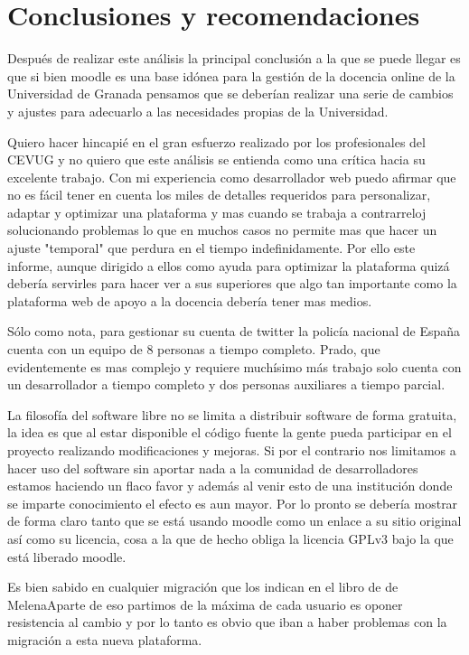 \chapter{Conclusiones y recomendaciones}

Después de realizar este análisis la principal conclusión a la que se puede llegar es que si bien moodle es una base idónea para la gestión de la docencia online de la Universidad de Granada pensamos que se deberían realizar una serie de cambios y ajustes para adecuarlo a las necesidades propias de la Universidad.

\bigskip
Quiero hacer hincapié en el gran esfuerzo realizado por los profesionales del CEVUG y no quiero que este análisis se entienda como una crítica hacia su excelente trabajo. Con mi experiencia como desarrollador web puedo afirmar que no es fácil tener en cuenta los miles de detalles requeridos para personalizar, adaptar y optimizar una plataforma y mas cuando se trabaja a contrarreloj solucionando problemas lo que en muchos casos no permite mas que hacer un ajuste "temporal" que perdura en el tiempo indefinidamente. Por ello este informe, aunque dirigido a ellos como ayuda para optimizar la plataforma quizá debería servirles para hacer ver a sus superiores que algo tan importante como la plataforma web de apoyo a la docencia debería tener mas medios.

\bigskip
Sólo como nota, para gestionar su cuenta de twitter la policía nacional de España cuenta con un equipo de 8 personas a tiempo completo. Prado, que evidentemente es mas complejo y requiere muchísimo más trabajo solo cuenta con un desarrollador a tiempo completo y dos personas auxiliares a tiempo parcial.

\bigskip

La filosofía del software libre no se limita a distribuir software de forma gratuita, la idea es que al estar disponible el código fuente la gente pueda participar en el proyecto realizando modificaciones y mejoras. Si por el contrario nos limitamos a hacer uso del software sin aportar nada a la comunidad de desarrolladores estamos haciendo un flaco favor y además al venir esto de una institución donde se imparte conocimiento el efecto es aun mayor. Por lo pronto se debería mostrar de forma claro tanto que se está usando moodle como un enlace a su sitio original así como su licencia, cosa a la que de hecho obliga la licencia GPLv3 bajo la que está liberado moodle.

\bigskip

Es bien sabido en cualquier migración que los  indican en el libro de de MelenaAparte de eso partimos de la máxima de cada usuario es oponer resistencia al cambio y por lo tanto es obvio que iban a haber problemas con la migración a esta nueva plataforma.

